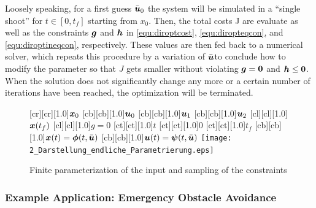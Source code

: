 Loosely speaking, for a first guess $\bar{\boldsymbol{u}}_0$ the system will be simulated in a “single shoot” for $t \in [0,t_f]$  starting from $x_0$. Then, the total costs J are evaluate as well as the constraints $\boldsymbol{g}$ and $\boldsymbol{h}$ in \eqref{equ:diroptcost}, \eqref{equ:diropteqcon}, and \eqref{equ:diroptineqcon}, respectively. These values are then fed back to a numerical solver, which repeats this procedure by a variation of $\bar{\boldsymbol{u}}$to conclude how to modify the parameter so that $J$ gets smaller without violating $\boldsymbol{g}=\boldsymbol{0}$ and $\boldsymbol{h}\leq\boldsymbol{0}$. When the solution does not significantly change any more or a certain number of iterations have been reached, the optimization will be terminated.



\begin{figure}[h]
\centering
	[cr][cr][1.0]{$\boldsymbol{x}_0$}
	[cb][cb][1.0]{$\boldsymbol{u}_0$}
	[cb][cb][1.0]{$\boldsymbol{u}_1$}
	[cb][cb][1.0]{$\boldsymbol{u}_2$}
	[cl][cl][1.0]{$\boldsymbol{x}(t_f)$}
	[cl][cl][1.0]{$g=0$}
	[ct][ct][1.0]{$t$}
	[ct][ct][1.0]{$0$}
	[ct][ct][1.0]{$t_f$}
	[cb][cb][1.0]{$\boldsymbol{x}(t) = \boldsymbol{\phi}(t,\bar{\boldsymbol{u}})$}
	[cb][cb][1.0]{$\boldsymbol{u}(t) = \boldsymbol{\psi}(t,\bar{\boldsymbol{u}})$}
 \texttt{[image: 2\_Darstellung\_endliche\_Parametrierung.eps]}
	\caption[Finite parameterization of the input]{Finite parameterization of the input and sampling of the constraints \cite{papageorgiou2012optimierung}} 
	\label{fig:parametrisierte_nmpc}
\end{figure}


\subsubsection{Example Application: Emergency Obstacle Avoidance}\label{S:57.3.2.2}

